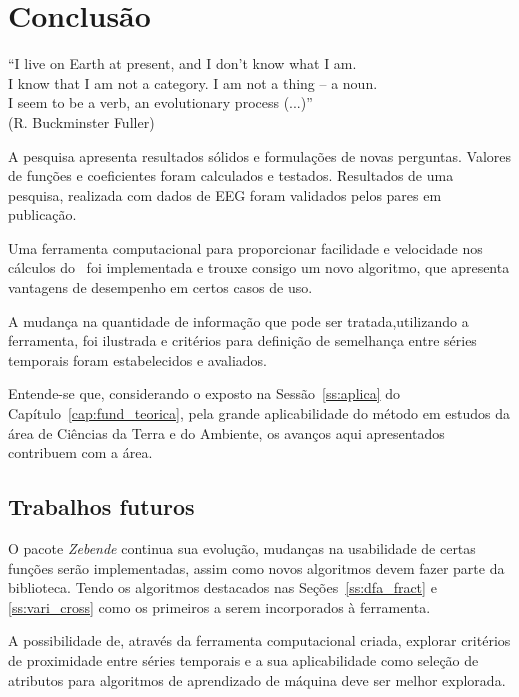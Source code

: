 \chapter{Conclusão}
\label{cap:coclusion}

\begin{flushright}
    ``I live on Earth at present, and I don’t know what I am. \\
    I know that I am not a category. I am not a thing -- a noun.\\ 
    I seem to be a verb, an evolutionary process (...)''\\[10px]
    (R. Buckminster Fuller)
    \end{flushright}

A pesquisa apresenta resultados sólidos e formulações de novas perguntas. Valores de funções e coeficientes foram calculados e testados. Resultados de uma pesquisa, realizada com dados de EEG foram validados pelos pares em publicação.

Uma ferramenta computacional para proporcionar facilidade e velocidade nos cálculos do \dmc~foi implementada e trouxe consigo um novo algoritmo, que apresenta vantagens de desempenho em certos casos de uso.

A mudança na quantidade de informação que pode ser tratada,utilizando a ferramenta, foi ilustrada e critérios para definição de semelhança entre séries temporais foram estabelecidos e avaliados.

Entende-se que, considerando o exposto na Sessão~\ref{ss:aplica} do Capítulo~\ref{cap:fund_teorica}, pela grande aplicabilidade do método em estudos da área de Ciências da Terra e do Ambiente, os avanços aqui apresentados contribuem com a área.

\section{Trabalhos futuros}

O pacote \emph{Zebende} continua sua evolução, mudanças na usabilidade de certas funções serão implementadas, assim como novos algoritmos devem fazer parte da biblioteca. Tendo os algoritmos destacados nas Seções~\ref{ss:dfa_fract} e \ref{ss:vari_cross} como os primeiros a serem incorporados à ferramenta.

A possibilidade de, através da ferramenta computacional criada, explorar critérios de proximidade entre séries temporais e a sua aplicabilidade como seleção de atributos para algoritmos de aprendizado de máquina deve ser melhor explorada.